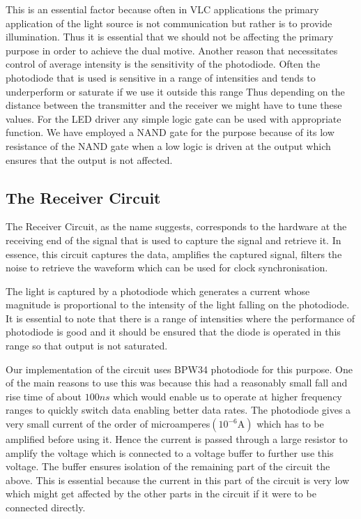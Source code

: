 \documentclass{article}
\begin{document}
This is an essential factor because often in VLC applications the primary application of the light source is not communication but rather is to provide illumination. Thus it is essential that we should not be affecting the primary purpose in order to achieve the dual motive. Another reason that necessitates control of average intensity is the sensitivity of the photodiode. Often the photodiode that is used is sensitive in a range of intensities and tends to underperform or saturate if we use it outside this range Thus depending on the distance between the transmitter and the receiver we might have to tune these values. For the LED driver any simple logic gate can be used with appropriate function. We have employed a NAND gate for the purpose because of its low resistance of the NAND gate when a low logic is driven at the output which ensures that the output is not affected.
\subsection{The Receiver Circuit}
The Receiver Circuit, as the name suggests, corresponds to the hardware at the receiving end of the signal that is used to capture the signal and retrieve it. In essence, this circuit captures the data, amplifies the captured signal, filters the noise to retrieve the waveform which can be used for clock synchronisation.

The light is captured by a photodiode which generates a current whose magnitude is proportional to the intensity of the light falling on the photodiode. It is essential to note that there is a range of intensities where the performance of photodiode is good and it should be ensured that the diode is operated in this range so that output is not saturated.

Our implementation of the circuit uses BPW34 photodiode for this purpose. One of the main reasons to use this was because this had a reasonably small fall and rise time of about $100ns$ which would enable us to operate at higher frequency ranges to quickly switch data enabling better data rates. The photodiode gives a very small current of the order of microamperes$(10^{-6}\text{A})$ which has to be amplified before using it. Hence the current is passed through a large resistor to amplify the voltage which is connected to a voltage buffer to further use this voltage. The buffer ensures isolation of the remaining part of the circuit the above. This is essential because the current in this part of the circuit is very low which might get affected by the other parts in the circuit if it were to be connected directly.
\end{document}
